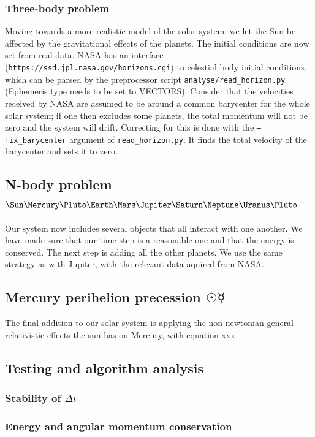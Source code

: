 \documentclass[10pt]{article}
\begin{document}
\begin{multicols}{2}
\subsubsection{Three-body problem} 
Moving towards a more realistic model of the solar system, we let the Sun
be affected by the gravitational effects of the planets. The initial
conditions are now set from real data. NASA 
has an interface (\texttt{https://ssd.jpl.nasa.gov/horizons.cgi}) to
celestial body initial conditions, which can be parsed by the preprocessor
script \texttt{analyse/read\_horizon.py} (Ephemeris type needs to be set to
VECTORS).  Consider that the velocities received by NASA are assumed to be
around a common barycenter for the whole solar system; if one then excludes
some planets, the total momentum will not be zero and the system will
drift.  
Correcting for this is done with the \texttt{--fix\_barycenter} argument of
\texttt{read\_horizon.py}. It finds the total velocity of the barycenter
and sets it to zero.


\subsection{N-body problem \texorpdfstring{$\Sun\Mercury\Pluto\Earth\Mars\Jupiter\Saturn\Neptune\Uranus\Pluto$}{}} 
Our system now includes several objects that all interact with one another.
We have made sure that our time step is a reasonable one and that the
energy is conserved. The next step is adding all the other planets. We use
the same strategy as with Jupiter, with the relevant data aquired from
NASA. 

\subsection{Mercury perihelion precession \texorpdfstring{$\Sun\Mercury$}{}} 
The final addition to our solar system is applying the non-newtonian
general relativistic effects the sun has on Mercury, with equation xxx

\subsection{Testing and algorithm analysis}
\subsubsection{Stability of \texorpdfstring{$\Delta t$}{}}
\subsubsection{Energy and angular momentum conservation}

\end{multicols}
\end{document}
